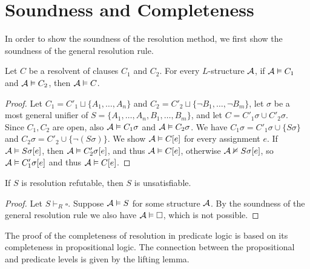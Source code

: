 \section{Soundness and Completeness}

In order to show the soundness of the resolution method, we first show the soundness of the general resolution rule.

\begin{lemma}
Let $C$ be a resolvent of clauses $C_1$ and $C_2$. For every $L$-structure $\mathcal{A}$, if $\mathcal{A} \vDash C_1$ and $\mathcal{A} \vDash C_2$, then $\mathcal{A} \vDash C$. 
\end{lemma}
\begin{proof}
Let $C_1 = C'_1 \sqcup \{A_1, \dots, A_n\}$ and $C_2 = C'_2 \sqcup \{\neg B_1, \dots, \neg B_m\}$, let $\sigma$ be a most general unifier of $S = \{A_1, \dots, A_n, B_1, \dots, B_m\}$, and let $C = C'_1 \sigma \cup C'_2 \sigma$. Since $C_1, C_2$ are open, also $\mathcal{A} \vDash C_1 \sigma$ and $\mathcal{A} \vDash C_2 \sigma$. We have $C_1 \sigma = C'_1 \sigma \cup \{S \sigma\}$ and $C_2 \sigma = C'_2 \cup \{\neg (S \sigma)\}$. We show $\mathcal{A} \vDash C[e]$ for every assignment $e$. If $\mathcal{A} \vDash S \sigma[e]$, then $\mathcal{A} \vDash C'_2 \sigma[e]$, and thus $\mathcal{A} \vDash C[e]$, otherwise $\mathcal{A} \nvDash S \sigma [e]$, so $\mathcal{A} \vDash C'_1 \sigma[e]$ and thus $\mathcal{A} \vDash C[e]$.
\end{proof}

\begin{theorem}
If $S$ is resolution refutable, then $S$ is unsatisfiable.
\end{theorem}
\begin{proof}
Let $S \vdash_R \square$. Suppose $\mathcal{A} \vDash S$ for some structure $\mathcal{A}$. By the soundness of the general resolution rule we also have $\mathcal{A} \vDash \square$, which is not possible.
\end{proof}

The proof of the completeness of resolution in predicate logic is based on its completeness in propositional logic. The connection between the propositional and predicate levels is given by the lifting lemma.


